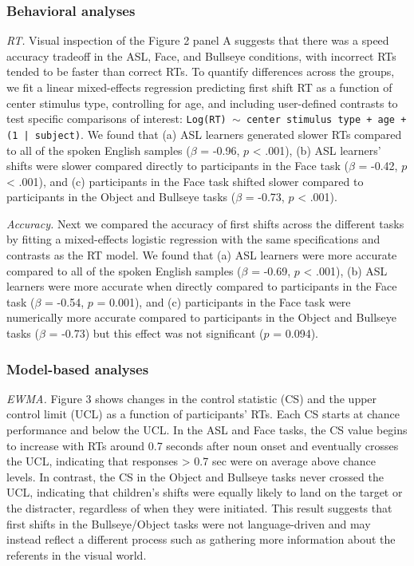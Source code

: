 \documentclass[10pt, letterpaper]{article}
\begin{document}
\subsubsection{Behavioral analyses}\label{behavioral-analyses}

\emph{RT.} Visual inspection of the Figure 2 panel A suggests that there
was a speed accuracy tradeoff in the ASL, Face, and Bullseye conditions,
with incorrect RTs tended to be faster than correct RTs. To quantify
differences across the groups, we fit a linear mixed-effects regression
predicting first shift RT as a function of center stimulus type,
controlling for age, and including user-defined contrasts to test
specific comparisons of interest:
\texttt{Log(RT) $\sim$ center stimulus type + age +  (1 | subject)}. We
found that (a) ASL learners generated slower RTs compared to all of the
spoken English samples (\(\beta\) = -0.96, \(p\) \textless{} .001), (b)
ASL learners' shifts were slower compared directly to participants in
the Face task (\(\beta\) = -0.42, \(p\) \textless{} .001), and (c)
participants in the Face task shifted slower compared to participants in
the Object and Bullseye tasks (\(\beta\) = -0.73, \(p\) \textless{}
.001).

\emph{Accuracy.} Next we compared the accuracy of first shifts across
the different tasks by fitting a mixed-effects logistic regression with
the same specifications and contrasts as the RT model. We found that (a)
ASL learners were more accurate compared to all of the spoken English
samples (\(\beta\) = -0.69, \(p\) \textless{} .001), (b) ASL learners
were more accurate when directly compared to participants in the Face
task (\(\beta\) = -0.54, \(p\) = 0.001), and (c) participants in the
Face task were numerically more accurate compared to participants in the
Object and Bullseye tasks (\(\beta\) = -0.73) but this effect was not
significant (\(p\) = 0.094).

\subsubsection{Model-based analyses}\label{model-based-analyses}

\emph{EWMA.} Figure 3 shows changes in the control statistic (CS) and
the upper control limit (UCL) as a function of participants' RTs. Each
CS starts at chance performance and below the UCL. In the ASL and Face
tasks, the CS value begins to increase with RTs around 0.7 seconds after
noun onset and eventually crosses the UCL, indicating that responses
\textgreater{} 0.7 sec were on average above chance levels. In contrast,
the CS in the Object and Bullseye tasks never crossed the UCL,
indicating that children's shifts were equally likely to land on the
target or the distracter, regardless of when they were initiated. This
result suggests that first shifts in the Bullseye/Object tasks were not
language-driven and may instead reflect a different process such as
gathering more information about the referents in the visual world.
\end{document}

